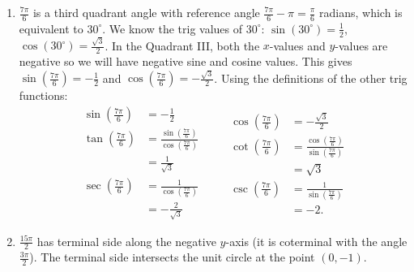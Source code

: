 \documentclass[nooutcomes]{ximera}
\begin{document}
\begin{exercise}
\begin{explanation}
\begin{enumerate}
			\item $\frac{7\pi}{6}$ is a third quadrant angle with reference angle $\frac{7\pi}{6} - \pi = \frac{\pi}{6}$ radians, which is equivalent to $30^\circ$.
				We know the trig values of $30^\circ$: $\sin(30^\circ)= \frac{1}{2}$, $\cos(30^\circ) = \frac{\sqrt{3}}{2}$.
				In the Quadrant III, both the $x$-values and $y$-values are negative so we will have negative sine and cosine values.
				This gives
				$\sin\left( \frac{7\pi}{6} \right) = -\frac{1}{2}$ and $\cos\left( \frac{7\pi}{6}\right) = -\frac{\sqrt{3}}{2}$. Using the definitions of the other trig
				 functions:
				$$
				  \begin{aligned}
				  \sin\left( \frac{7\pi}{6} \right) &= -\frac{1}{2}\\
				  \tan\left( \frac{7\pi}{6} \right) &= \frac{\sin\left( \frac{7\pi}{6} \right)}{\cos\left( \frac{7\pi}{6} \right)}\\
					&= \frac{1}{\sqrt{3}}\\
				  \sec\left( \frac{7\pi}{6} \right) &= \frac{1}{\cos\left( \frac{7\pi}{6} \right)}\\
				  	&= -\frac{2}{\sqrt{3}}
				  \end{aligned}
				  \qquad
				  \begin{aligned}
				  \cos\left( \frac{7\pi}{6} \right) &= -\frac{\sqrt{3}}{2}\\
				  \cot\left( \frac{7\pi}{6} \right) &= \frac{\cos\left( \frac{7\pi}{6} \right)}{\sin\left( \frac{7\pi}{6} \right)}\\
					&= \sqrt{3}\\
				  \csc\left( \frac{7\pi}{6} \right) &= \frac{1}{\sin\left( \frac{7\pi}{6} \right)}\\
				  	&= -2.    
				  \end{aligned}
				  $$
				  
				  
				  
			
			\item $\frac{15\pi}{2}$ has terminal side along the negative $y$-axis (it is coterminal with the angle $\frac{3\pi}{2}$). The terminal side intersects
				the unit circle at the point $(0, -1)$.
				\begin{image}
\end{image}
\end{enumerate}
\end{explanation}
\end{exercise}
\end{document}

